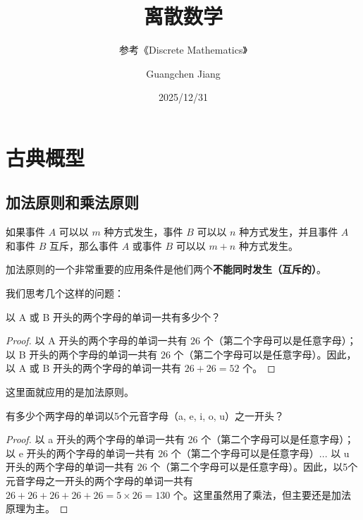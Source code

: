\documentclass[lang=cn,math=mtpro2,11pt,scheme=chinese,pad]{elegantbook}
\title{离散数学}
\subtitle{参考《Discrete Mathematics》}
\author{Guangchen Jiang}
\date{2025/12/31}
\begin{document}
\maketitle
\frontmatter

\tableofcontents

\mainmatter

\chapter{古典概型}

\section{加法原则和乘法原则}

\begin{theorem}[加法原则]
  如果事件 \(A\) 可以以 \(m\) 种方式发生，事件 \(B\) 可以以 \(n\) 种方式发生，并且事件 \(A\) 和事件 \(B\) 互斥，那么事件 \(A\) 或事件 \(B\) 可以以 \(m+n\) 种方式发生。
\end{theorem}

加法原则的一个非常重要的应用条件是他们两个\textbf{不能同时发生（互斥的）}。

我们思考几个这样的问题：

\begin{example}
  以 A 或 B 开头的两个字母的单词一共有多少个？
\end{example}
\begin{proof}
  以 A 开头的两个字母的单词一共有 \(26\) 个（第二个字母可以是任意字母）；以 B 开头的两个字母的单词一共有 \(26\) 个（第二个字母可以是任意字母）。因此，以 A 或 B 开头的两个字母的单词一共有 \(26 + 26 = 52\) 个。
\end{proof}
这里面就应用的是加法原则。

\begin{example}
  有多少个两字母的单词以5个元音字母（a, e, i, o, u）之一开头？
\end{example}
\begin{proof}
   以 a 开头的两个字母的单词一共有 \(26\) 个（第二个字母可以是任意字母）；以 e 开头的两个字母的单词一共有 \(26\) 个（第二个字母可以是任意字母）... 以 u 开头的两个字母的单词一共有 \(26\) 个（第二个字母可以是任意字母）。因此，以5个元音字母之一开头的两个字母的单词一共有 \(26 + 26 + 26 + 26 + 26 = 5 \times 26 = 130\) 个。这里虽然用了乘法，但主要还是加法原理为主。
\end{proof}
\end{document}
